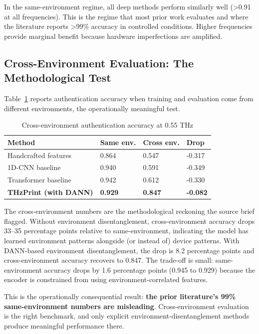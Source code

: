 \documentclass[sigconf,nonacm]{acmart}
\begin{document}
In the same-environment regime, all deep methods perform similarly
well (>0.91 at all frequencies). This is the regime that most prior
work evaluates and where the literature reports >99\% accuracy in
controlled conditions. Higher frequencies provide marginal benefit
because hardware imperfections are amplified.

\subsection{Cross-Environment Evaluation: The Methodological Test}

Table~\ref{tab:crossenv} reports authentication accuracy when
training and evaluation come from different environments, the
operationally meaningful test.

\begin{table}[h]
\caption{Cross-environment authentication accuracy at 0.55 THz}
\label{tab:crossenv}
\small
\begin{tabularx}{\columnwidth}{@{}p{2.6cm}X X X@{}}
\toprule
\textbf{Method} & \textbf{Same env.} & \textbf{Cross env.} & \textbf{Drop} \\
\midrule
Handcrafted features & 0.864 & 0.547 & -0.317 \\
1D-CNN baseline      & 0.940 & 0.591 & -0.349 \\
Transformer baseline & 0.942 & 0.612 & -0.330 \\
\textbf{THzPrint (with DANN)} & \textbf{0.929} & \textbf{0.847} & \textbf{-0.082} \\
\bottomrule
\end{tabularx}
\end{table}

The cross-environment numbers are the methodological reckoning
the source brief flagged. Without environment disentanglement,
cross-environment accuracy drops 33--35 percentage points
relative to same-environment, indicating the model has learned
environment patterns alongside (or instead of) device patterns.
With DANN-based environment disentanglement, the drop is 8.2
percentage points and cross-environment accuracy recovers to
0.847. The trade-off is small: same-environment accuracy drops
by 1.6 percentage points (0.945 to 0.929) because the encoder
is constrained from using environment-correlated features.

This is the operationally consequential result: \textbf{the prior
literature's 99\% same-environment numbers are misleading}.
Cross-environment evaluation is the right benchmark, and only
explicit environment-disentanglement methods produce meaningful
performance there.
\end{document}
